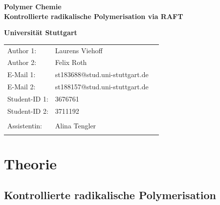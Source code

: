 \documentclass[10pt,a4paper,ngerman]{scrartcl}
\begin{document}
\begin{titlepage}
	\vspace*{2,5cm}
	\begin{center}
		\begin{LARGE}
			\textbf{Polymer Chemie}\\
			\textbf{Kontrollierte radikalische Polymerisation via RAFT}\\
		\end{LARGE}
		\vspace{1cm}
		\textbf{Universität Stuttgart}\\
		\vspace*{1,5cm}
		\begin{tabular}{lp{}l}
			Author 1:     &Laurens Viehoff\\
            Author 2:     &Felix Roth\\   
			E-Mail 1:      &st183688@stud.uni-stuttgart.de\\
            E-Mail 2:      &st188157@stud.uni-stuttgart.de  \\
			Student-ID 1: & 3676761   \\ 
            Student-ID 2: & 3711192 \\ \\
			Assistentin:  & Alina Tengler \\ \\ 
		\end{tabular}
	\end{center}

    
\end{titlepage}
\thispagestyle{empty}
\renewcommand{\thepage}{\arabic{page}}
\newpage
\tableofcontents
\setcounter{page}{1}
\renewcommand{\thepage}{\arabic{page}}
\newpage

\section{Theorie}

	\subsection{Kontrollierte radikalische Polymerisation}
\end{document}
